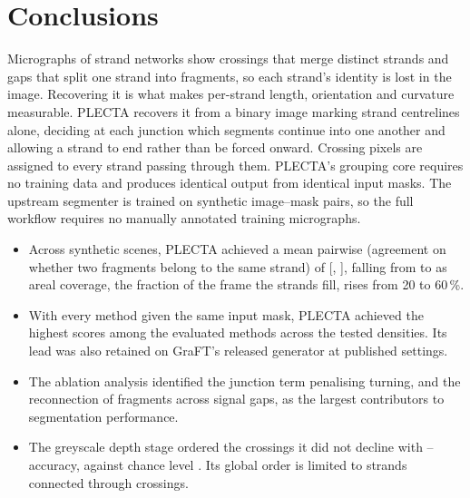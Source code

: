 \section{Conclusions}
\label{sec:conclusions}
\label{sec:discussion}
\label{sec:limitations}

Micrographs of strand networks show crossings that merge distinct strands and
gaps that split one strand into fragments, so each strand's identity is lost
in the image. Recovering it is what makes per-strand length, orientation and
curvature measurable. PLECTA recovers it from a binary image marking strand
centrelines alone, deciding at each junction which segments continue into one
another and allowing a strand to end rather than be forced onward. Crossing
pixels are assigned to every strand passing through them. PLECTA's grouping
core requires no training data and produces identical output from identical
input masks. The upstream segmenter is trained on synthetic image--mask pairs,
so the full workflow requires no manually annotated training micrographs.

\begin{itemize}[leftmargin=1.5em,label=\textbullet,topsep=6pt,itemsep=2pt,parsep=0pt]
  \item Across \PlectaHeldoutSceneCount{} synthetic scenes, PLECTA achieved a mean
        pairwise \Fone{} (agreement on whether two fragments belong to the
        same strand) of \PlectaHeldoutFOneMean{} [\PlectaHeldoutFOneCILow{},
        \PlectaHeldoutFOneCIHigh{}], falling from
        \PlectaDensityTwoZeroFOneMean{} to \PlectaDensitySixZeroFOneMean{} as
        areal coverage, the fraction of the frame the strands fill, rises from 20
        to 60\,\%.
  \item With every method given the same input mask, PLECTA achieved the highest
        scores among the evaluated methods across the tested densities. Its lead
        was also retained on GraFT's released generator at published settings.
  \item The ablation analysis identified the junction term penalising turning, and
        the reconnection of fragments across signal gaps, as the largest
        contributors to segmentation performance.
  \item The greyscale depth stage ordered the crossings it did not decline with
        \PlectaDepthDecidedLow{}--\PlectaDepthDecidedHigh{} accuracy, against
        chance level \PlectaDepthChance{}. Its global order is limited to
        strands connected through crossings.
\end{itemize}

